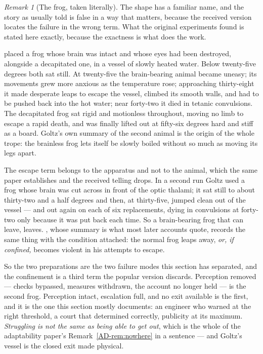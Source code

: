 \documentclass[11pt,a4paper]{article}
\theoremstyle{remark}
\newtheorem{remark}[definition]{Remark}
\begin{document}
\begin{remark}[The frog, taken literally]\label{rem:frog}
The shape has a familiar name, and the story as usually told is false in a way that matters, because the
received version locates the failure in the wrong term. What the original experiments found is stated
here exactly, because the exactness is what does the work.

\citet{goltz1869} placed a frog whose brain was intact and whose eyes had been destroyed, alongside a
decapitated one, in a vessel of slowly heated water. Below twenty-five degrees both sat still. At
twenty-five the brain-bearing animal became uneasy; its movements grew more anxious as the temperature
rose; approaching thirty-eight it made desperate leaps to escape the vessel, climbed its smooth walls,
and had to be pushed back into the hot water; near forty-two it died in tetanic convulsions. The
decapitated frog sat rigid and motionless throughout, moving no limb to escape a rapid death, and was
finally lifted out at fifty-six degrees hard and stiff as a board. Goltz's own summary of the second
animal is the origin of the whole trope: the brainless frog lets itself be slowly boiled without so much
as moving its legs apart.

The escape term belongs to the apparatus and not to the animal, which the same paper establishes and the
received telling drops. In a second run Goltz used a frog whose brain was cut across in front of the
optic thalami; it sat still to about thirty-two and a half degrees and then, at thirty-five, jumped clean
out of the vessel --- and out again on each of six replacements, dying in convulsions at forty-two only
because it was put back each time. So a brain-bearing frog that can leave, leaves.
\citet{sedgwick1888}, whose summary is what most later accounts quote, records the same thing with the
condition attached: the normal frog leaps away, \emph{or, if confined,} becomes violent in his attempts
to escape.

So the two preparations are the two failure modes this section has separated, and the confinement is a
third term the popular version discards. Perception removed --- checks bypassed, measures withdrawn, the
account no longer held --- is the second frog. Perception intact, escalation full, and no exit available
is the first, and it is the one this section mostly documents: an engineer who warned at the right
threshold, a court that determined correctly, publicity at its maximum. \emph{Struggling is not the same
as being able to get out}, which is the whole of the adaptability paper's Remark~\ref{AD-rem:nowhere} in
a sentence --- and Goltz's vessel is the closed exit made physical.


\end{remark}
\end{document}
